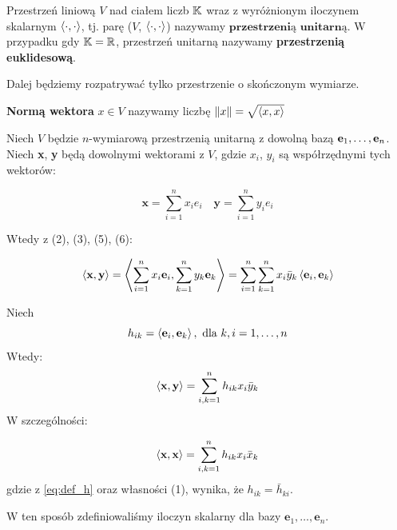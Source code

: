 \begin{definition}
Przestrzeń liniową $V$ nad ciałem liczb $\mathbb{K}$ wraz z wyróżnionym iloczynem skalarnym $\left\langle \cdot, \cdot \right\rangle$, tj. parę ($V$, $\left\langle \cdot, \cdot \right\rangle$) nazywamy $\textbf{przestrzenią unitarną}$.
W przypadku gdy $\mathbb{K} = \mathbb{R}$, przestrzeń unitarną nazywamy \textbf{przestrzenią euklidesową}.
\end{definition}

Dalej będziemy rozpatrywać tylko przestrzenie o skończonym wymiarze.

\begin{definition}
    \textbf{Normą wektora} $x \in V$ nazywamy liczbę $\left\| x \right\| = \sqrt{\left\langle x, x \right\rangle}$ 
\end{definition}

Niech $V$ będzie $n$-wymiarową przestrzenią unitarną z dowolną bazą $\mathbf{e}_1, \ldots, \mathbf{e}_n$. Niech \textbf{x}, \textbf{y} będą dowolnymi wektorami z $V$, gdzie $x_i$, $y_i$ są współrzędnymi tych wektorów:

\begin{center}
    $$\textbf{x} = \sum_{i=1}^{n}{x_{i}e_{i}} \quad \textbf{y} = \sum_{i=1}^{n}{y_{i}e_{i}}$$
\end{center}
Wtedy z (2), (3), (5), (6):
\begin{center}
    $$\left\langle \textbf{x}, \textbf{y} \right\rangle = \left\langle 
        \sum_{i=1}^{n}{x_{i} \textbf{e}_i}
    , 
        \sum_{k=1}^{n}{y_{k} \textbf{e}_k}
     \right\rangle = \sum_{i=1}^{n}{\sum_{k=1}^{n}{x_{i} \bar{y}_{k} \left\langle \textbf{e}_{i}, \textbf{e}_{k} \right\rangle}}$$
\end{center}
Niech
\begin{equation}\label{eq:def_h}
    h_{ik} = \left\langle \textbf{e}_i, \textbf{e}_k \right\rangle, \text{ dla }k,i = 1, \ldots, n 
\end{equation}
Wtedy: 
\begin{equation}\label{eq:std_inner}
    \left\langle \textbf{x}, \textbf{y} \right\rangle = \sum_{i,k=1}^{n}{h_{ik} x_{i} \bar{y}_{k}}
\end{equation}
W szczególności:

\begin{equation}
    \left\langle \textbf{x}, \textbf{x} \right\rangle = \sum_{i,k=1}^{n}{h_{ik} x_{i} \bar{x}_{k}}
\end{equation}
gdzie z \eqref{eq:def_h} oraz własności (1), wynika, że $h_{ik} = \bar{h}_{ki}$.

W ten sposób zdefiniowaliśmy iloczyn skalarny dla bazy $\textbf{e}_1, \ldots, \textbf{e}_n$. 

